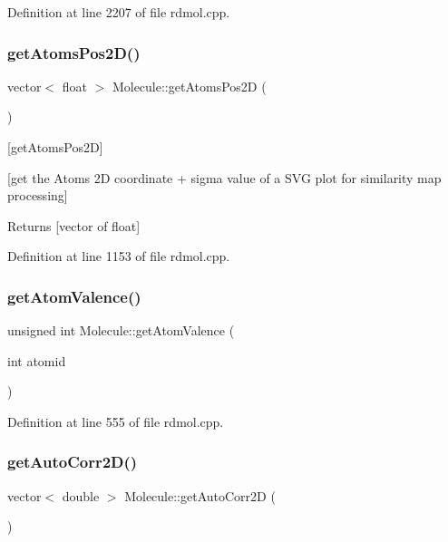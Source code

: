 Definition at line 2207 of file rdmol.\+cpp.

\mbox{\label{class_molecule_aa995ba2f208be94be9d1bbb756cb1e91}} 
\subsubsection{\texorpdfstring{get\+Atoms\+Pos2\+D()}{getAtomsPos2D()}}
{\footnotesize\ttfamily vector$<$ float $>$ Molecule\+::get\+Atoms\+Pos2D (\begin{DoxyParamCaption}{ }\end{DoxyParamCaption})}



\mbox{[}get\+Atoms\+Pos2D\mbox{]} 

\mbox{[}get the Atoms 2D coordinate + sigma value of a S\+VG plot for similarity map processing\mbox{]} \begin{DoxyReturn}{Returns}
\mbox{[}vector of float\mbox{]} 
\end{DoxyReturn}


Definition at line 1153 of file rdmol.\+cpp.

\mbox{\label{class_molecule_a9fb0b5f467ac50bb3eac31d194b5fba7}} 
\subsubsection{\texorpdfstring{get\+Atom\+Valence()}{getAtomValence()}}
{\footnotesize\ttfamily unsigned int Molecule\+::get\+Atom\+Valence (\begin{DoxyParamCaption}\item[{int}]{atomid }\end{DoxyParamCaption})}



Definition at line 555 of file rdmol.\+cpp.

\mbox{\label{class_molecule_ae8f8eb2feb22bfb7567d5c4886ef7957}} 
\subsubsection{\texorpdfstring{get\+Auto\+Corr2\+D()}{getAutoCorr2D()}}
{\footnotesize\ttfamily vector$<$ double $>$ Molecule\+::get\+Auto\+Corr2D (\begin{DoxyParamCaption}{ }\end{DoxyParamCaption})}



